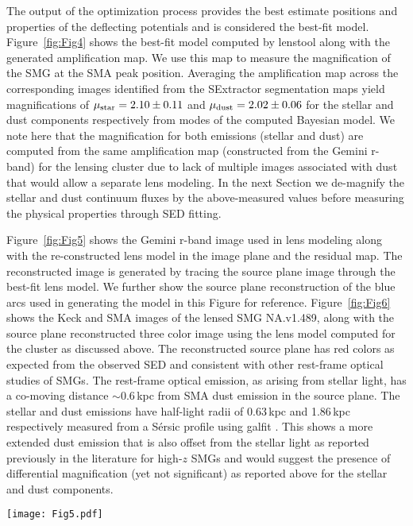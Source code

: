 \documentclass[iop,apj,useAMS,usenatbib]{emulateapj-rtx4}
\begin{document}
The output of the optimization process provides the best
estimate positions and properties of the deflecting potentials and is
considered the best-fit model. Figure~\ref{fig:Fig4} shows the
best-fit model computed by {\sc lenstool} along with the generated
amplification map. We use this map to measure the magnification of the
SMG at the SMA peak position. Averaging the amplification map across
the corresponding images identified from the {\sc SExtractor}
segmentation maps yield magnifications of $\mu_{\rm
  star}=2.10\pm0.11$ and $\mu_{\rm dust}=2.02\pm0.06$ for the stellar
and dust components respectively from modes of the computed Bayesian
model. We note here that the magnification for
both emissions (stellar and dust) are computed from the same
amplification map (constructed from the Gemini r-band) for the lensing
cluster due to lack of multiple images associated with dust that would
allow a separate lens modeling. In the next Section we de-magnify the
  stellar and dust continuum fluxes by the above-measured values
  before measuring the physical properties through SED fitting.

Figure~\ref{fig:Fig5} shows the Gemini r-band image used in lens
modeling along with the re-constructed lens model in the image plane and
the residual map. The reconstructed image is generated by tracing the
source plane image through the best-fit lens model. We further show
the source plane reconstruction of the blue arcs used in generating
the model in this Figure for reference. Figure~\ref{fig:Fig6} shows
the Keck and SMA images of the lensed SMG NA.v1.489, along with the
source plane reconstructed three color image using the lens model
computed for the cluster as discussed above. The reconstructed source
plane has red colors as expected from the observed SED and consistent
with other rest-frame optical studies of SMGs. The rest-frame optical
emission, as arising from stellar light, has a co-moving distance
$\sim0.6\,$kpc from SMA dust emission in the
source plane. The stellar and dust emissions have half-light radii of
0.63\,kpc and 1.86\,kpc respectively measured from a S\'{e}rsic profile
using {\sc galfit} \citep{Peng2002}. This shows a more extended dust emission that is also
offset from the stellar light as reported previously in the literature
for high-$z$ SMGs \citep{Hodge2015, Spilker2015} and would
  suggest the presence of differential magnification (yet not
  significant) as reported above for the stellar and dust components. 

\begin{figure*}
\centering
\leavevmode
\texttt{[image: Fig5.pdf]}
\caption{The lens model of the foreground cluster constructed by
  {\sc lenstool} using the Gemini r-band image. The lens panel
  further shows the critical and caustic lines constructed by the
  model. The sub-panels in the lens model and residual maps represent
  the F110W image and residual of the small arc around G1
  respectively. The source plane reconstruction of the blue arcs (Figure~\ref{fig:Fig1}) in the
  cluster field used for building the model is shown in the far
  right.}
\label{fig:Fig5}
\end{figure*}
\end{document}
